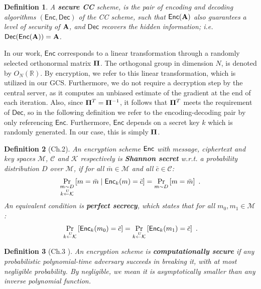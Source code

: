 \documentclass[journal,letterpaper,onecolumn,twoside,nofonttune]{IEEEtran}
\newcommand{\Cc}{\mathcal{C}}
\newcommand{\K}{\mathcal{K}}
\newcommand{\M}{\mathcal{M}}
\newcommand{\Pibold}{\bold{\Pi}}
\newcommand{\R}{\mathbb{R}}
\newcommand{\Ab}{\bold{A}}
\newcommand{\getsU}{\overset{\ U}{\gets}}
\newcommand{\sfsty}[1]{\ensuremath{\mathsf{#1}}}  %
\newcommand{\Enc}{\sfsty{Enc}}
\newcommand{\Dec}{\sfsty{Dec}}
\newtheorem{Def}{Definition}
\begin{document}
\begin{Def}
\label{secure_CC_def}
A \textbf{secure CC} scheme, is the pair of encoding and decoding algorithms $(\Enc,\Dec)$ of the CC scheme, such that $\Enc(\Ab)$ also guarantees a level of security of $\Ab$, and $\Dec$ recovers the hidden information; \textit{i.e.} $\Dec(\Enc(\Ab))=\Ab$.
\end{Def}

In our work, $\Enc$ corresponds to a linear transformation through a randomly selected orthonormal matrix $\Pibold$. The orthogonal group in dimension $N$, is denoted by $O_N(\R)$. By encryption, we refer to this linear transformation, which is utilized in our GCS. Furthermore, we do not require a decryption step by the central server, as it computes an unbiased estimate of the gradient at the end of each iteration. Also, since $\Pibold^T=\Pibold^{-1}$, it follows that $\Pibold^T$ meets the requirement of $\Dec$, so in the following definition we refer to the encoding-decoding pair by only referencing $\Enc$. Furthermore, $\Enc$ depends on a secret key $k$ which is randomly generated. In our case, this is simply $\Pibold$.

\begin{Def}[Ch.2\cite{KL14}]
\label{Sh_secr}
An encryption scheme $\textup{\textsf{Enc}}$ with message, ciphertext and key spaces $\M$, $\Cc$ and $\K$ respectively is \textbf{Shannon secret} w.r.t. a probability distribution $D$ over $\M$, if for all $\bar{m}\in\M$ and all $\bar{c}\in\Cc$:
\begin{equation}
  \Pr_{{\substack{m\sim D\\ k\getsU\K}}}\left[m=\bar{m}\mid\textup{\textsf{Enc}}_k(m)=\bar{c}\right] = \Pr_{m\sim D}\left[m=\bar{m}\right] \ .
\end{equation}
An equivalent condition is \textbf{perfect secrecy}, which states that for all $m_0,m_1\in\M$:
\begin{equation}
\label{perf_secrecy_id}
  \Pr_{k\getsU\K}\left[\textup{\textsf{Enc}}_k(m_0)=\bar{c}\right] = \Pr_{k\getsU\K}\left[\textup{\textsf{Enc}}_k(m_1)=\bar{c}\right] \ .
\end{equation}
\end{Def}

\begin{Def}[Ch.3 \cite{KL14}]
\label{comp_sec}
An encryption scheme is \textbf{computationally secure} if any probabilistic polynomial-time adversary succeeds in breaking it, with at most negligible probability. By negligible, we mean it is asymptotically smaller than any inverse polynomial function.
\end{Def}
\end{document}
